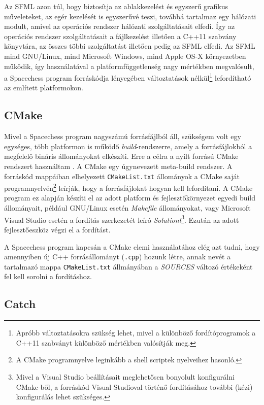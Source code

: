 \documentclass[12pt, twoside]{report}
\begin{document}
Az SFML azon túl, hogy biztosítja az ablakkezelést és egyszerű grafikus műveleteket, az egér kezelését is egyszerűvé teszi, továbbá tartalmaz egy hálózati modult, amivel az operációs rendszer hálózati szolgáltatásait elfedi. Így az operációs rendszer szolgáltatásait a fájlkezelést illetően a C++11 szabvány könyvtára, az összes többi szolgáltatást illetően pedig az SFML elfedi. Az SFML mind GNU/Linux, mind Microsoft Windows, mind Apple OS-X környezetben működik, így használatával a platformfüggetlenség nagy mértékben megvalósult, a Spacechess program forráskódja lé\-nye\-gé\-ben változtatások nélkül\footnote{Apróbb változtatásokra szükség lehet, mivel a különböző fordítóprogramok a C++11 szabványt különböző mértékben valósítják meg.} lefordítható az említett platformokon. 

\subsection{CMake}

Mivel a Spacechess program nagyszámú forrásfájlból áll, szükségem volt egy egységes, több platformon is működő \emph{build}-rendszerre, amely a forrásfájlokból a megfelelő bináris állományokat elkészíti. Erre a célra a nyílt forrású CMake rendszert használtam \cite{cmake}. A CMake egy úgynevezett meta-build rendszer. A forráskód mappáiban elhelyezett {\tt CMakeList.txt} állományok a CMake saját programnyelvén\footnote{A CMake programnyelve leginkább a shell scriptek nyelveihez hasonló.} leírják, hogy a for\-rás\-fáj\-lo\-kat hogyan kell lefordítani. A CMake program ez alapján készíti el az adott platform és fejlesztőkörnyezet egyedi build állományait, például GNU/Linux esetén \emph{Makefile} állományokat, vagy Microsoft Visual Studio esetén a fordítás szerkezetét leíró \emph{Solutiont}\footnote{Mivel a Visual Studio beállításait meglehetősen bonyolult konfigurálni CMake-ből, a forráskód Visual Studioval történő fordításához további (kézi) konfigurálás lehet szükséges.}. Ezután az adott fejlesztőeszköz végzi el a fordítást.

A Spacechess program kapcsán a CMake elemi használatához elég azt tudni, hogy amennyiben új C++ forrásállományt ({\tt *.cpp}) hozunk létre, annak nevét a tartalmazó mappa {\tt CMakeList.txt} állmányában a \emph{SOURCES} változó értékeként fel kell sorolni a fordításhoz.

\subsection{Catch}
\end{document}
